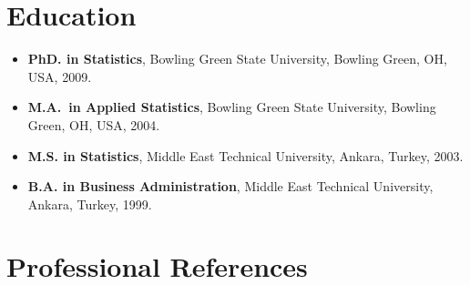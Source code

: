 \documentclass[11pt,a4paper,]{moderncv}
\providecommand{\tightlist}{%
	\setlength{\itemsep}{0pt}\setlength{\parskip}{0pt}}
\begin{document}
\section{Education}\label{education-1}

\begin{itemize}
\tightlist
\item
  \textbf{PhD. in Statistics}, Bowling Green State University, Bowling
  Green, OH, USA, 2009.
\item
  \textbf{M.A.~in Applied Statistics}, Bowling Green State University,
  Bowling Green, OH, USA, 2004.
\item
  \textbf{M.S. in Statistics}, Middle East Technical University, Ankara,
  Turkey, 2003.
\item
  \textbf{B.A. in Business Administration}, Middle East Technical
  University, Ankara, Turkey, 1999.
\end{itemize}

\section{Professional References}\label{professional-references-1}
\end{document}
